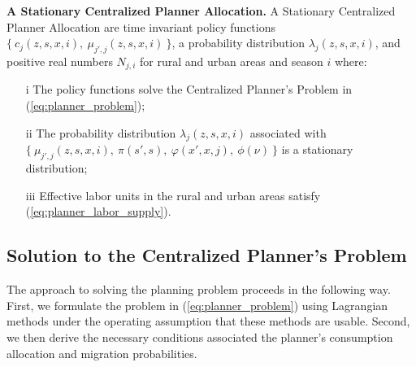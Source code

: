 \documentclass[12pt,pdftex]{article}
\begin{document}
\begin{onehalfspacing}
\textbf{A Stationary Centralized Planner Allocation.}  A Stationary Centralized Planner Allocation are time invariant policy functions $\{\ c_{j}(z, s, x, i),\ \mu_{j',j}(z, s, x, i) \ \}$, a probability distribution $\lambda_{j}(z, s, x, i)$, and positive real numbers $N_{j,i}$ for rural and urban areas and season $i$ where:
\begin{itemize}
\item[i] The policy functions solve the Centralized Planner's Problem in (\ref{eq:planner_problem});
\item[ii] The probability distribution $\lambda_{j}(z, s, x, i)$ associated with $\{\ \mu_{j',j}(z, s, x, i), \ \pi(s',s), \ \varphi(x',x, j), \ \phi(\nu) \ \}$ is a stationary distribution;
\item[iii] Effective labor units in the rural and urban areas satisfy (\ref{eq:planner_labor_supply}).
\end{itemize}

\subsection{Solution to the Centralized Planner's Problem}

The approach to solving the planning problem proceeds in the following way. First, we formulate the problem in (\ref{eq:planner_problem}) using Lagrangian methods under the operating assumption that these methods are usable. Second, we then derive the necessary conditions associated the planner's consumption allocation and migration probabilities.  


\end{onehalfspacing}
\end{document}
